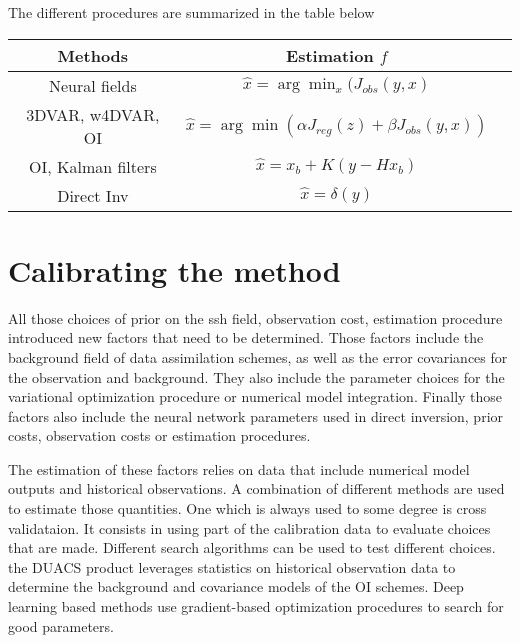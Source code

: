 \begin{bibunit}
The different procedures are summarized in the table below

\begin{table}
  \begin{tabular}{|c|c|c|}
\hline
    Methods & Estimation $f$ \\
\hline
    Neural fields & $\hat{x} = \arg\min_x(J_{obs}(y, x)$ \\
\hline
    3DVAR, w4DVAR, OI & $\hat{x} = \arg\min(\alpha J_{reg}(z) + \beta J_{obs}(y, x))$ \\
\hline
    OI, Kalman filters & $\hat{x} = x_b + K(y - Hx_b)$ \\
\hline
    Direct Inv & $\hat{x} = \delta(y)$ \\
\hline
\end{tabular}

\end{table}

%




\section{Calibrating the method}
All those choices of prior on the ssh field, observation cost, estimation procedure introduced new factors that need to be determined.
Those factors include the background field of data assimilation schemes, as well as the error covariances for the observation and background. They also include the parameter choices for the variational optimization procedure or numerical model integration. Finally those factors also include the neural network parameters used in direct inversion, prior costs, observation costs or estimation procedures.

The estimation of these factors relies on data that include numerical model outputs and historical observations.
A combination of different methods are used to estimate those quantities. One which is always used to some degree is cross validataion. It consists in using part of the calibration data to evaluate choices that are made. 
Different search algorithms can be used to test different choices. the DUACS product leverages statistics on historical observation data to determine the background and covariance models of the OI schemes. 
Deep learning based methods use gradient-based optimization procedures to search for good parameters.


\end{bibunit}
